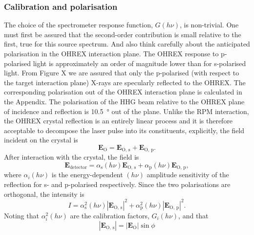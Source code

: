 \subsubsection{Calibration and polarisation}
The choice of the spectrometer response function, $G(h\nu)$, is non-trivial. One must first be assured that the second-order contribution is small relative to the first, true for this source spectrum. And also think carefully about the anticipated polarisation in the OHREX interaction plane. The OHREX response to p-polarised light is approximately an order of magnitude lower than for s-polarised light. From Figure X we are assured that only the p-polarised (with respect to the target interaction plane) X-rays are specularly reflected to the OHREX. The corresponding polarisation out of the OHREX interaction plane is calculated in the Appendix. The polarisation of the HHG beam relative to the OHREX plane of incidence and reflection is \qty{10.5}{\degree} out of the plane. Unlike the RPM interaction, the OHREX crystal reflection is an entirely linear process and it is therefore acceptable to decompose the laser pulse into its constituents, explicitly, the field incident on the crystal is
\begin{equation}
	\mathbf{E_\mathrm{O}} = \mathbf{E}_\mathrm{O,\, s} + \mathbf{E}_\mathrm{O,\, p}.
\end{equation}
After interaction with the crystal, the field is
\begin{equation}
	\mathbf{E}_\mathrm{detector} = \alpha_\mathrm{s}(h\nu)\mathbf{E}_\mathrm{O,\, s} + \alpha_\mathrm{p}(h\nu)\mathbf{E}_\mathrm{O,\, p},
\end{equation}
where $\alpha_i(h\nu)$ is the energy-dependent $(h\nu)$ amplitude sensitivity of the reflection for s- and p-polarised respectively. Since the two polarisations are orthogonal, the intensity is
\begin{equation}
	I = \alpha^2_\mathrm{s}(h\nu)|\mathbf{E}_\mathrm{O,\, s}|^2 + \alpha^2_\mathrm{p}(h\nu)|\mathbf{E}_\mathrm{O,\, p}|^2.
\end{equation}
Noting that $\alpha^2_i(h\nu)$ are the calibration factors, $G_i(h\nu)$, and that
\begin{equation}
	|\mathbf{E}_\mathrm{O,\, s}| = |\mathbf{E_\mathrm{O}}|\sin\phi
\end{equation}
